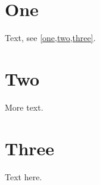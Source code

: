 \documentclass{article}
\begin{document}
\section{One}\label{one}
Text, see \cref{one,two,three}.

\setcounter{page}{7}
\section{Two}\label{two}
More text.

\newpage
\section{Three}\label{three}
Text \label{in-text} here.
\end{document}
